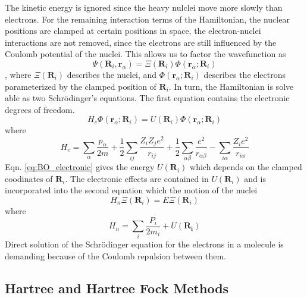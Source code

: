 The kinetic energy is ignored since the heavy nulclei move more slowly than electrons.  For the remaining interaction terms of the Hamiltonian, the nuclear positions are clamped at certain positions in space, the electron-nuclei interactions are not removed, since the electrons are still influenced by the Coulomb potential of the nuclei.  This allows us to factor the wavefunction as
\begin{equation}
	\Psi(\bm{R}_i,\bm{r}_\alpha) = \Xi(\bm{R}_i)\Phi(\bm{r}_\alpha;\bm{R}_i)
\end{equation},
where $\Xi(\bm{R}_i)$ describes the nuclei, and $\Phi(\bm{r}_\alpha;\bm{R}_i)$ describes the electrons parameterized by the clamped position of $\bm{R}_i$.  In turn, the Hamiltonian is solve able as two Schr\"{o}dinger's equations.  The first equation contains the electronic degrees of freedom.
\begin{equation}
\label{eq:BO_electronic}
     H_{e}\Phi(\bm{r}_\alpha;\bm{R}_i)=U(\bm{R}_i)\Phi(\bm{r}_\alpha;\bm{R}_i)
\end{equation}
where
\begin{equation}
	H_e = \sum_\alpha \frac{p_\alpha}{2m}
	      + \frac{1}{2} \sum_{ij} \frac{Z_i Z_j e^2}{r_{ij}}
	      + \frac{1}{2} \sum_{\alpha\beta} \frac{e^2}{r_{\alpha\beta}}
	      - \sum_{i\alpha} \frac{Z_i e^2}{r_{i\alpha}}
\end{equation}
Eqn. \ref{eq:BO_electronic} gives the energy $U(\bm{R}_i)$ which depends on the clamped coodinates of $\bm{R}_i$.  The electronic effects are contained in $U(\bm{R}_i)$ and is incorporated into the second equation which the motion of the nuclei
\begin{equation}
\label{eq:BO_nuclei}
    H_n\Xi(\bm{R}_i)=E\Xi(\bm{R}_i)
\end{equation}
where
\begin{equation}
\label{eq:H_n}
    H_n = \sum_i \frac{P_i}{2m_i} + U(\bm{R_i})
\end{equation}
Direct solution of the Schr{\"o}dinger equation for the electrons in a molecule is demanding because of the Coulomb repulsion between them.

\subsection{Hartree and Hartree Fock Methods}

